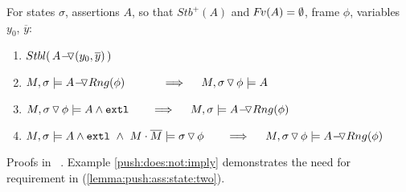 {
\begin{lemma} 
\label{lemma:push:ass:state}
For  states  $\sigma$, assertions $A$, %
so that $Stb^+(A)$ and $\fv(A)=\emptyset$,  %
frame $\phi$,  variables $y_0$, $\overline y$: %

\begin{enumerate}
 \item
\label{l:push:stbl}
$\Stable{\,  \PushASLong {(y_0,\overline y)} A\, }$
\item
 \label{lemma:push:ass:state:one}
$M, \sigma \models \PushASLong  {Rng(\phi)} {A}\ \  \ \ \ \ \  \ \ \    \Longrightarrow  \ \ \ \ M,  \PushSLong {\phi} {\sigma}   \models A$
\item
 \label{lemma:push:ass:state:two}
$M,  \PushSLong {\phi} {\sigma}   \models  A  \wedge \extThis    \ \  \ \ \  \  \Longrightarrow  \ \ \ \ M, \sigma \models \PushASLong  {Rng(\phi)} {A}$
 \item
 \label{lemma:push:ass:state:three}
$M, \sigma  \models  A  \wedge \extThis  \ \wedge \ M\cdot\Mtwo \models \PushSLong {\phi} {\sigma}   \ \  \ \ \  \  \Longrightarrow  \ \ \ \ M, \PushSLong {\phi} {\sigma} \models \PushASLong  {Rng(\phi)} {A}$
\end{enumerate}
\end{lemma}
}

{
Proofs %
 in \A\ . Example \ref{push:does:not:imply}
 demonstrates the need for      %
  requirement in  %
  (\ref{lemma:push:ass:state:two}). %
}



